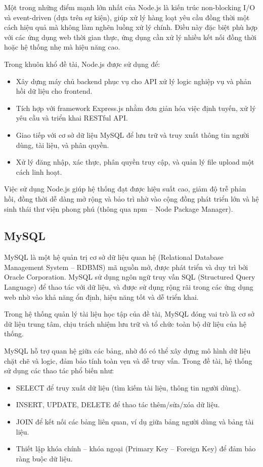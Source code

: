 \documentclass{article}
\begin{document}
	Một trong những điểm mạnh lớn nhất của Node.js là kiến trúc non-blocking I/O và event-driven (dựa trên sự kiện), giúp xử lý hàng loạt yêu cầu đồng thời một cách hiệu quả mà không làm nghẽn luồng xử lý chính. Điều này đặc biệt phù hợp với các ứng dụng web thời gian thực, ứng dụng cần xử lý nhiều kết nối đồng thời hoặc hệ thống nhẹ mà hiệu năng cao.
	
	Trong khuôn khổ đề tài, Node.js được sử dụng để:
	\begin{itemize}
		\item Xây dựng máy chủ backend phục vụ cho API xử lý logic nghiệp vụ và phản hồi dữ liệu cho frontend.
		\item Tích hợp với framework Express.js nhằm đơn giản hóa việc định tuyến, xử lý yêu cầu và triển khai RESTful API.
		\item Giao tiếp với cơ sở dữ liệu MySQL để lưu trữ và truy xuất thông tin người dùng, tài liệu, và phân quyền.
		\item Xử lý đăng nhập, xác thực, phân quyền truy cập, và quản lý file upload một cách linh hoạt.
	\end{itemize}
	
	Việc sử dụng Node.js giúp hệ thống đạt được hiệu suất cao, giảm độ trễ phản hồi, đồng thời dễ dàng mở rộng và bảo trì nhờ vào cộng đồng phát triển lớn và hệ sinh thái thư viện phong phú (thông qua npm – Node Package Manager).
	
	\subsection{MySQL}
	
	MySQL là một hệ quản trị cơ sở dữ liệu quan hệ (Relational Database Management System – RDBMS) mã nguồn mở, được phát triển và duy trì bởi Oracle Corporation. MySQL sử dụng ngôn ngữ truy vấn SQL (Structured Query Language) để thao tác với dữ liệu, và được sử dụng rộng rãi trong các ứng dụng web nhờ vào khả năng ổn định, hiệu năng tốt và dễ triển khai.
	
	Trong hệ thống quản lý tài liệu học tập của đề tài, MySQL đóng vai trò là cơ sở dữ liệu trung tâm, chịu trách nhiệm lưu trữ và tổ chức toàn bộ dữ liệu của hệ thống.
	
	MySQL hỗ trợ quan hệ giữa các bảng, nhờ đó có thể xây dựng mô hình dữ liệu chặt chẽ và logic, đảm bảo tính toàn vẹn và dễ truy vấn. Trong đề tài, hệ thống sử dụng các thao tác phổ biến như:
	\begin{itemize}
		\item SELECT để truy xuất dữ liệu (tìm kiếm tài liệu, thông tin người dùng).
		\item INSERT, UPDATE, DELETE để thao tác thêm/sửa/xóa dữ liệu.
		\item JOIN để kết nối các bảng liên quan, ví dụ giữa bảng người dùng và bảng tài liệu.
		\item Thiết lập khóa chính – khóa ngoại (Primary Key – Foreign Key) để đảm bảo ràng buộc dữ liệu.
	\end{itemize}
	
\end{document}
